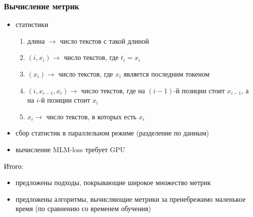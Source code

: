 \documentclass{beamer}
\begin{document}
\begin{frame}
	\frametitle{Вычисление метрик}
	\begin{itemize}
		\item статистики
			\begin{enumerate}
				\item длина $\rightarrow$ число текстов с такой длиной
				\item $(i, x_i) \rightarrow$ число текстов, где $t_i = x_i$ 
				\item $(x_i)\rightarrow$ число текстов, где $x_i$ является последним токеном
				\item $(i, x_{i-1}, x_i) \rightarrow$ число текстов, где на $(i-1)$-й позиции стоит $x_{i-1}$, а на $i$-й позиции стоит $x_i$
				\item $x_i \rightarrow$ число текстов, в которых есть $x_i$
			\end{enumerate}
		\item сбор статистик в параллельном режиме (разделение по данным)
		\item вычисление MLM-loss требует GPU
	\end{itemize}
	\noindent\makebox[\linewidth]{\rule{\paperwidth}{0.4pt}}
	Итого:
	\begin{itemize}
		\item предложены подходы, покрывающие широкое множество метрик
		\item предложены алгоритмы, вычисляющие метрики за пренебрежимо маленькое время (по сравнению со временем обучения)
	\end{itemize}
\end{frame}
\end{document}
